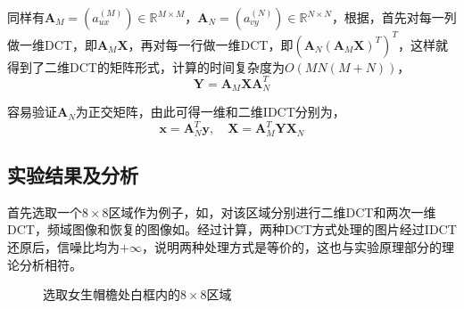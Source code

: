 \documentclass[12pt,a4paper]{article}
\begin{document}
同样有$\mathbf{A}_M = (a_{ux}^{(M)}) \in \mathbb{R}^{M\times M}$，$\mathbf{A}_N = (a_{vy}^{(N)}) \in \mathbb{R}^{N\times N}$，根据，首先对每一列做一维DCT，即$\mathbf{A}_M \mathbf{X}$，再对每一行做一维DCT，即$(\mathbf{A}_N(\mathbf{A}_M \mathbf{X})^T)^T$，这样就得到了二维DCT的矩阵形式，计算的时间复杂度为$O(MN(M+N))$，
\begin{equation}
    \mathbf{Y} = \mathbf{A}_M \mathbf{X} \mathbf{A}_N^T
\end{equation}

容易验证$\mathbf{A}_N$为正交矩阵，由此可得一维和二维IDCT分别为，
\begin{equation}
    \mathbf{x} = \mathbf{A}_N^T \mathbf{y}, \quad \mathbf{X} = \mathbf{A}_M^T \mathbf{Y} \mathbf{X}_N
\end{equation}

\subsection{实验结果及分析}

首先选取一个$8\times 8$区域作为例子，如，对该区域分别进行二维DCT和两次一维DCT，频域图像和恢复的图像如。经过计算，两种DCT方式处理的图片经过IDCT还原后，信噪比均为$+\infty$，说明两种处理方式是等价的，这也与实验原理部分的理论分析相符。

\begin{figure}[H]
    \centering
    \caption{选取女生帽檐处白框内的$8\times 8$区域}
    \label{fig:block_pos}
\end{figure}
\end{document}

